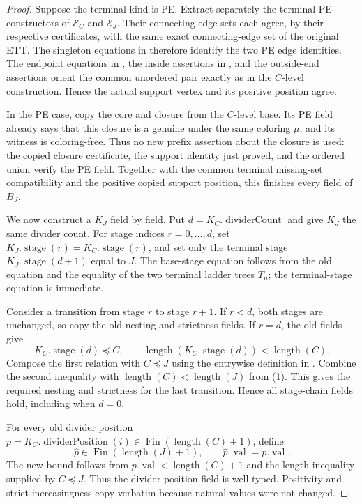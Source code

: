 \begin{proof}
Suppose the terminal kind is PE.  Extract separately the terminal PE
constructors of $\mathcal E_C$ and $\mathcal E_J$.  Their connecting-edge
sets each agree, by their respective
 certificates, with the same
exact connecting-edge set of the original ETT.  The singleton equations
in  therefore identify the two PE edge
identities.  The endpoint equations in
, the inside assertions in
, and the outside-end assertions orient the
common unordered pair exactly as in the $C$-level construction.  Hence
the actual support vertex and its positive position agree.

In the PE case, copy the core and closure from the $C$-level base.  Its PE
field already says that this closure is a genuine
 under the same coloring $\mu$, and its
 witness is coloring-free.  Thus no new prefix
assertion about the closure is used: the copied closure certificate, the
support identity just proved, and the ordered union verify the PE field.
Together with the common terminal missing-set compatibility and the
positive copied support position, this finishes every field of $B_J$.

We now construct a  $K_J$ field by field.  Put
$d=K_C.\operatorname{dividerCount}$ and give $K_J$ the same divider count.
For stage indices $r=0,\ldots,d$, set
$K_J.\operatorname{stage}(r)=K_C.\operatorname{stage}(r)$, and set only
the terminal stage $K_J.\operatorname{stage}(d+1)$ equal to $J$.  The
base-stage equation follows from the old equation and the equality of the
two terminal ladder trees $T_n$; the terminal-stage equation is immediate.

Consider a transition from stage $r$ to stage $r+1$.  If $r<d$, both
stages are unchanged, so copy the old nesting and strictness fields.  If
$r=d$, the old fields give
\[
 K_C.\operatorname{stage}(d)\preccurlyeq C,\qquad
 \operatorname{length}(K_C.\operatorname{stage}(d))
       <\operatorname{length}(C).
\]
Compose the first relation with $C\preccurlyeq J$ using the entrywise
definition in .  Combine the second
inequality with
$\operatorname{length}(C)<\operatorname{length}(J)$ from (1).  This gives
the required nesting and strictness for the last transition.  Hence all
stage-chain fields hold, including when $d=0$.

For every old divider position
$p=K_C.\operatorname{dividerPosition}(i)\in
\operatorname{Fin}(\operatorname{length}(C)+1)$, define
\[
 \widehat p\in\operatorname{Fin}(\operatorname{length}(J)+1),
 \qquad \widehat p.\operatorname{val}=p.\operatorname{val}.
\]
The new bound follows from $p.\operatorname{val}<
\operatorname{length}(C)+1$ and the length inequality supplied by
$C\preccurlyeq J$.  Thus the divider-position field is well typed.
Positivity and strict increasingness copy verbatim because natural values
were not changed.


\end{proof}
